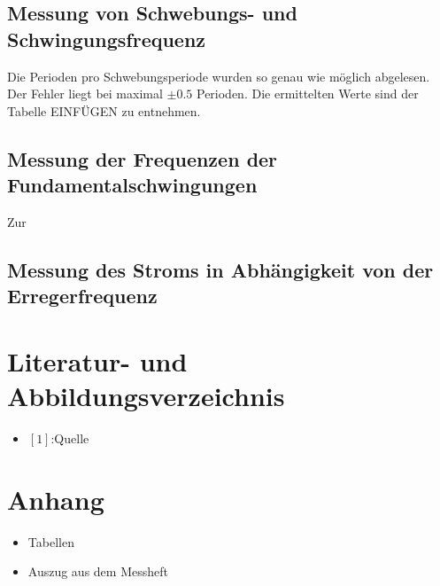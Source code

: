 \documentclass[11pt,ngerman,a4paper]{article}
\begin{document}
\subsection{Messung von Schwebungs- und Schwingungsfrequenz}
Die Perioden pro Schwebungsperiode wurden so genau wie möglich abgelesen. Der Fehler liegt bei maximal $\pm 0.5$ Perioden. Die ermittelten Werte sind der Tabelle EINFÜGEN zu entnehmen.


\subsection{Messung der Frequenzen der Fundamentalschwingungen}
 Zur
\subsection{Messung des Stroms in Abhängigkeit von der Erregerfrequenz}

\section{Literatur- und Abbildungsverzeichnis}
\begin{itemize}
\item $[1]$:Quelle
\end{itemize}
\section{Anhang}
\begin{itemize}
\item Tabellen
\item Auszug aus dem Messheft


\end{itemize}

\newpage
\end{document}
